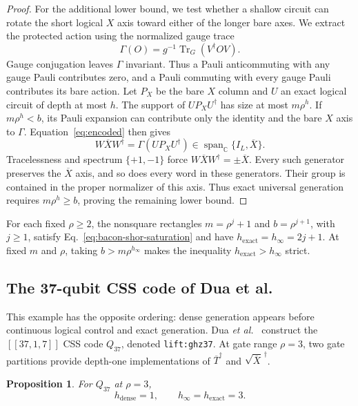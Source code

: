\documentclass[aps,prl,reprint,notitlepage,nofootinbib,nobibnotes]{revtex4-2}
\newtheorem{proposition}{Proposition}
\newcommand{\id}{I}
\begin{document}
\begin{proof}
For the additional lower bound, we test whether a shallow circuit can rotate the short logical $X$
axis toward either of the longer bare axes. We extract the protected action using the normalized
gauge trace
\begin{equation}\label{eq:gauge-trace}
 \Gamma(O)=g^{-1}\operatorname{Tr}_G(V^\dagger OV).
\end{equation}
Gauge conjugation leaves $\Gamma$ invariant. Thus a Pauli anticommuting with any gauge Pauli
contributes zero, and a Pauli commuting with every gauge Pauli contributes its bare action. Let
$P_X$ be the bare $X$ column and $U$ an exact logical circuit of depth at most $h$. The support of
$UP_XU^\dagger$ has size at most $m\rho^h$. If $m\rho^h<b$, its Pauli expansion can contribute only
the identity and the bare $X$ axis to $\Gamma$. Equation~\eqref{eq:encoded} then gives
\[
 W\overline X W^\dagger
 =\Gamma(UP_XU^\dagger)\in
 \operatorname{span}_{\mathbb C}\{\id_L,\overline X\}.
\]
Tracelessness and spectrum $\{+1,-1\}$ force $W\overline XW^\dagger=\pm\overline X$. Every such
generator preserves the $\overline X$ axis, and so does every word in these generators. Their group
is contained in the proper normalizer of this axis. Thus exact universal generation requires
$m\rho^h\ge b$, proving the remaining lower bound.
\end{proof}

For each fixed $\rho\ge2$, the nonsquare rectangles $m=\rho^j+1$ and $b=\rho^{j+1}$, with $j\ge1$,
satisfy Eq.~\eqref{eq:bacon-shor-saturation} and have $h_{\mathrm{exact}}=h_\infty=2j+1$. At fixed
$m$ and $\rho$, taking $b>m\rho^{h_\infty}$ makes the inequality $h_{\mathrm{exact}}>h_\infty$
strict.

\subsection*{The 37-qubit CSS code of Dua et al.}
\label{sm:dua-example}

This example has the opposite ordering: dense generation appears before continuous logical control
and exact generation. Dua \emph{et al.}~\cite[Sec.~V and App.~B]{Dua} construct the $[[37,1,7]]$
CSS code $Q_{37}$, denoted \texttt{lift:ghz37}. At gate range $\rho=3$, two gate partitions provide
depth-one implementations of $\overline T^\dagger$ and $\sqrt{\overline X}^{\,\dagger}$.

\begin{proposition}\label{prop:dua-example}
For $Q_{37}$ at $\rho=3$,
\begin{equation}\label{eq:dua-thresholds}
 h_{\mathrm{dense}}=1,\qquad h_\infty=h_{\mathrm{exact}}=3.
\end{equation}
\end{proposition}
\end{document}

